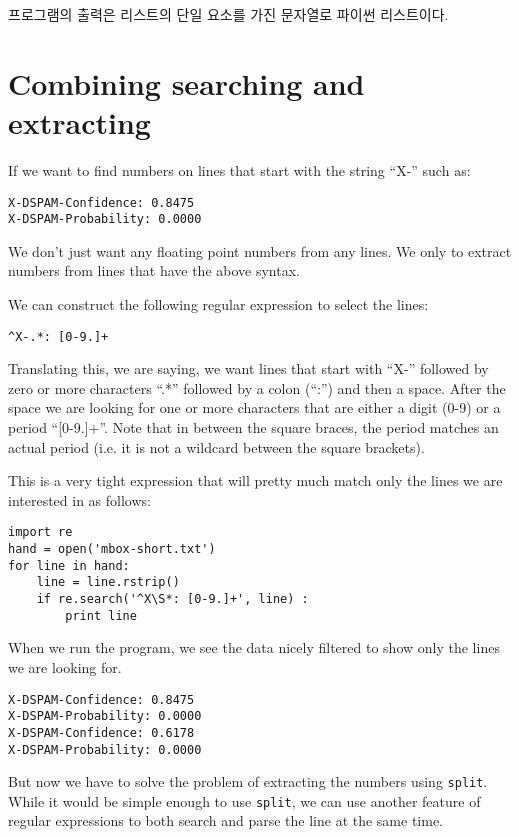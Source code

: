 프로그램의 출력은 리스트의 단일 요소를 가진 문자열로 파이썬 리스트이다.

\section{Combining searching and extracting}

If we want to find numbers on lines that start with the string ``X-'' such as:

\beforeverb
\begin{verbatim}
X-DSPAM-Confidence: 0.8475
X-DSPAM-Probability: 0.0000  
\end{verbatim}
\afterverb
%
We don't just want any floating point numbers from any lines.  We only to extract numbers from lines that have the above syntax.

We can construct the following regular expression to select the lines:

\beforeverb
\begin{verbatim}
^X-.*: [0-9.]+
\end{verbatim}
\afterverb
%
Translating this, we are saying, we want lines that start with ``X-'' followed by zero or more characters ``.*'' followed by a colon (``:'') and then a space.  After the space we are looking for one or more characters that are either a digit (0-9) or a period ``[0-9.]+''.  Note that in between the square braces, the period matches an actual period (i.e. it is not a wildcard between the square brackets).

This is a very tight expression that will pretty much match only the lines we are interested in as follows:

\beforeverb
\begin{verbatim}
import re
hand = open('mbox-short.txt')
for line in hand:
    line = line.rstrip()
    if re.search('^X\S*: [0-9.]+', line) :
        print line
\end{verbatim}
\afterverb
%
When we run the program, we see the data nicely filtered to show 
only the lines we are looking for.

\beforeverb
\begin{verbatim}
X-DSPAM-Confidence: 0.8475
X-DSPAM-Probability: 0.0000
X-DSPAM-Confidence: 0.6178
X-DSPAM-Probability: 0.0000
\end{verbatim}
\afterverb
%
But now we have to solve the problem of extracting the numbers using {\tt split}.  While it would be simple enough to use {\tt split}, we can use another feature of regular expressions to both search and parse the line at the same time.

